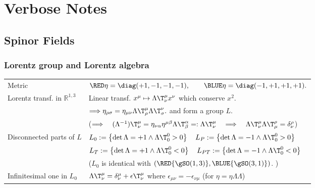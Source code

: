 
\section{Verbose Notes}
\subsection{Spinor Fields}
\def\redblue#1#2{({\RED{#1}},{\BLUE{#2}})}

\subsubsection{Lorentz group and Lorentz algebra}
\label{sec:verbose-lorentz-group}
\begin{tabular}{l@{ :\ \ \ }l}
Metric &  ${\RED\eta} = \diag(+1, -1, -1, -1),\qquad {\BLUE \eta} = \diag(-1,+1,+1,+1).$\\
Lorentz transf. in $\mathbb R^{1,3}$ & Linear transf. $x^\mu \mapsto \Lambda\T^\mu_\nu x^\nu$ which conserve $x^2$.\\
 & $\Longrightarrow \Hrsd = \Hmnd \Lambda\T^\mu_\rho \Lambda\T^\nu_\sigma.$
 and form a group $L$.\\
 & \qquad
   ($\Longrightarrow\quad
     (\Lambda^{-1})\T^\mu_\nu=\eta_{\nu\alpha}\eta^{\mu\beta}\Lambda\T^\alpha_\beta=:\Lambda\T_\nu^\mu\quad\Longrightarrow\quad\Lambda\T^\mu_\nu\Lambda\T_\mu^\rho=\delta^\rho_\nu$)\\[.8zw]

Disconnected parts of $L$ &
  $L_0 := \left\{ \det\Lambda = +1 \land \Lambda\T_0^0 >0\right\} \quad
   L_P := \left\{ \det\Lambda = -1 \land \Lambda\T_0^0 >0\right\}$\\
& $L_T := \left\{ \det\Lambda = +1 \land \Lambda\T_0^0 <0\right\} \quad
   L_{PT} := \left\{ \det\Lambda = -1 \land \Lambda\T_0^0 <0\right\}$\\
& \qquad ($L_0$ is identical with $\redblue{\gSO(1,3)}{\gSO(3,1)}$. )\\[1zw]
Infinitesimal one in $L_0$& $\Lambda\T^\mu_\nu = \delta^\mu_\nu + \epsilon\T^\mu_\nu$ where $\epsilon_{\mu\nu}=-\epsilon_{\nu\mu}$ (for $\eta=\eta\Lambda\Lambda$)\\[1zw]
\end{tabular}

\vspace{1zw}


